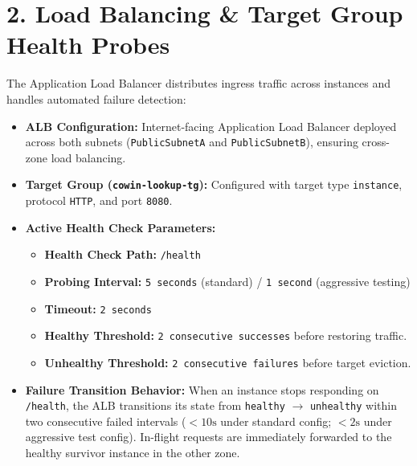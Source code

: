 \documentclass[11pt,a4paper]{article}
\newcommand{\sectionline}[1]{\section*{\color{navy}#1}}
\begin{document}
\newpage
\sectionline{2. Load Balancing \& Target Group Health Probes}
The Application Load Balancer distributes ingress traffic across instances and handles automated failure detection:

\begin{itemize}
    \item \textbf{ALB Configuration:} Internet-facing Application Load Balancer deployed across both subnets (\texttt{PublicSubnetA} and \texttt{PublicSubnetB}), ensuring cross-zone load balancing.
    \item \textbf{Target Group (\texttt{cowin-lookup-tg}):} Configured with target type \texttt{instance}, protocol \texttt{HTTP}, and port \texttt{8080}.
    \item \textbf{Active Health Check Parameters:}
    \begin{itemize}
        \item \textbf{Health Check Path:} \texttt{/health}
        \item \textbf{Probing Interval:} \texttt{5 seconds} (standard) / \texttt{1 second} (aggressive testing)
        \item \textbf{Timeout:} \texttt{2 seconds}
        \item \textbf{Healthy Threshold:} \texttt{2 consecutive successes} before restoring traffic.
        \item \textbf{Unhealthy Threshold:} \texttt{2 consecutive failures} before target eviction.
    \end{itemize}
    \item \textbf{Failure Transition Behavior:} When an instance stops responding on \texttt{/health}, the ALB transitions its state from \texttt{healthy} $\to$ \texttt{unhealthy} within two consecutive failed intervals ($< 10\text{s}$ under standard config; $< 2\text{s}$ under aggressive test config). In-flight requests are immediately forwarded to the healthy survivor instance in the other zone.
\end{itemize}
\end{document}
